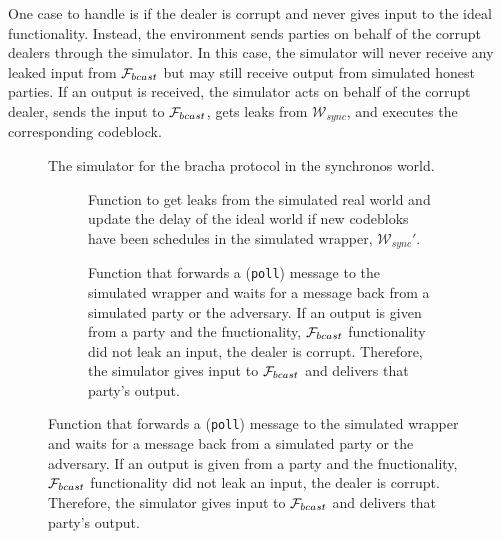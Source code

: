 One case to handle is if the dealer is corrupt and never gives input to the ideal functionality.
Instead, the environment sends parties on behalf of the corrupt dealers through the simulator.
In this case, the simulator will never receive any leaked input from $\mathcal{F}_{bcast}$ but may still receive output from simulated honest parties.
If an output is received, the simulator acts on behalf of the corrupt dealer, sends the input to $\mathcal{F}_{bcast}$, gets leaks from $\mathcal{W}_{sync}$, and executes the corresponding codeblock.

\begin{figure}[!htb]
	
	\caption{The simulator for the bracha protocol in the synchronos world.}
	\label{fig:sim:bracha_ours}
\end{figure}

\begin{figure}[!htb]
	\begin{subfigure}{\textwidth}
	
	\label{fig:algo:simgetleaks}
	\caption{Function to get leaks from the simulated real world and update the delay of the ideal world if new codebloks have been schedules in the simulated wrapper, $\mathcal{W}_{sync}'$.}
	\end{subfigure}
	\newline
	\begin{subfigure}{\textwidth}
	
	\label{fig:algo:poll}
	\caption{Function that forwards a (\texttt{poll}) message to the simulated wrapper and waits for a message back from a simulated party or the adversary. If an output is given from a party and the fnuctionality, $\mathcal{F}_{bcast}$ functionality did not leak an input, the dealer is corrupt. Therefore, the simulator gives input to $\mathcal{F}_{bcast}$ and delivers that party's output.}
	\end{subfigure}
\end{figure}
